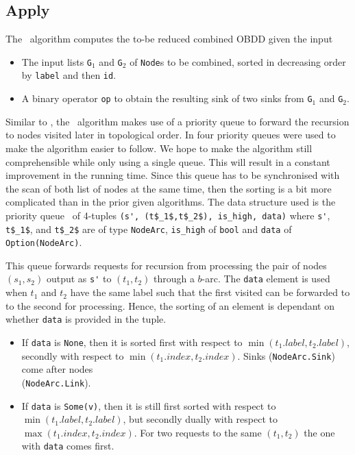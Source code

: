 \subsection{Apply} \label{sec:theory__apply}
The \Apply\ algorithm computes the to-be reduced combined OBDD given the input
\begin{itemize}
\item The input lists \lstinline{G}$_1$ and \lstinline{G}$_2$ of
  \lstinline{Node}s to be combined, sorted in decreasing order by
  \lstinline{label} and then \lstinline{id}.

\item A binary operator \lstinline{op} to obtain the resulting sink of two sinks
  from \lstinline{G}$_1$ and \lstinline{G}$_2$.
\end{itemize}

Similar to \Restrict, the \Apply\ algorithm makes use of a priority queue to
forward the recursion to nodes visited later in topological order. In
\cite{Arge96} four priority queues were used to make the algorithm easier to
follow. We hope to make the algorithm still comprehensible while only using a
single queue. This will result in a constant improvement in the running time.
Since this queue has to be synchronised with the scan of both list of nodes at
the same time, then the sorting is a bit more complicated than in the prior
given algorithms. The data structure used is the priority queue \ApplyQrec\ of
4-tuples \lstinline{(s', (t$_1$,t$_2$), is_high, data)} where \lstinline{s'},
\lstinline{t$_1$}, and \lstinline{t$_2$} are of type \lstinline{NodeArc},
\lstinline{is_high} of \lstinline{bool} and \lstinline{data} of
\lstinline{Option(NodeArc)}.

\newpage
This queue forwards requests for recursion from processing the pair of nodes
$(s_1, s_2)$ output as \lstinline{s'} to $(t_1,t_2)$ through a $b$-arc. The
\lstinline{data} element is used when $t_1$ and $t_2$ have the same label such
that the first visited can be forwarded to to the second for processing. Hence,
the sorting of an element is dependant on whether \lstinline{data} is provided
in the tuple.

\begin{itemize}
\item If \lstinline{data} is \lstinline{None}, then it is sorted first with
  respect to $\min(t_1.\mathit{label},t_2.\mathit{label})$, secondly with respect
  to $\min(t_1.\mathit{index},t_2.\mathit{index})$. Sinks
  (\lstinline{NodeArc.Sink}) come after nodes\\(\lstinline{NodeArc.Link}).

\item If \lstinline{data} is \lstinline{Some(v)}, then it is still first
  sorted with respect to $\min(t_1.\mathit{label},t_2.\mathit{label})$, but
  secondly dually with respect to $\max(t_1.\mathit{index}, t_2.\mathit{index})$.
  For two requests to the same $(t_1,t_2)$ the one with \lstinline{data} comes
  first.
\end{itemize}

